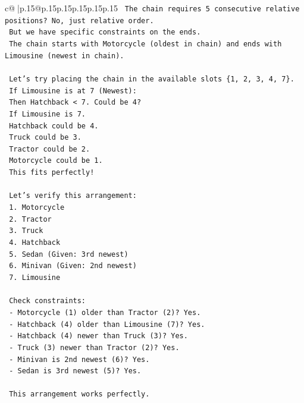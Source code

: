 \documentclass{article}
\begin{document}
{\begin{supertabular}{c@{$\;$}|p{.15\linewidth}@{}p{.15\linewidth}p{.15\linewidth}p{.15\linewidth}p{.15\linewidth}p{.15\linewidth}}
{{{\texttt{    The chain requires 5 consecutive relative positions? No, just relative order.} \\
\texttt{    But we have specific constraints on the ends.} \\
\texttt{    The chain starts with Motorcycle (oldest in chain) and ends with Limousine (newest in chain).} \\
\\ 
\texttt{    Let's try placing the chain in the available slots \{1, 2, 3, 4, 7\}.} \\
\texttt{    If Limousine is at 7 (Newest):} \\
\texttt{    Then Hatchback < 7. Could be 4?} \\
\texttt{    If Limousine is 7.} \\
\texttt{    Hatchback could be 4.} \\
\texttt{    Truck could be 3.} \\
\texttt{    Tractor could be 2.} \\
\texttt{    Motorcycle could be 1.} \\
\texttt{    This fits perfectly!} \\
\\ 
\texttt{    Let's verify this arrangement:} \\
\texttt{    1. Motorcycle} \\
\texttt{    2. Tractor} \\
\texttt{    3. Truck} \\
\texttt{    4. Hatchback} \\
\texttt{    5. Sedan (Given: 3rd newest)} \\
\texttt{    6. Minivan (Given: 2nd newest)} \\
\texttt{    7. Limousine} \\
\\ 
\texttt{    Check constraints:} \\
\texttt{    {-} Motorcycle (1) older than Tractor (2)? Yes.} \\
\texttt{    {-} Hatchback (4) older than Limousine (7)? Yes.} \\
\texttt{    {-} Hatchback (4) newer than Truck (3)? Yes.} \\
\texttt{    {-} Truck (3) newer than Tractor (2)? Yes.} \\
\texttt{    {-} Minivan is 2nd newest (6)? Yes.} \\
\texttt{    {-} Sedan is 3rd newest (5)? Yes.} \\
\\ 
\texttt{    This arrangement works perfectly.} \\
}}}
\end{supertabular}}
\end{document}
